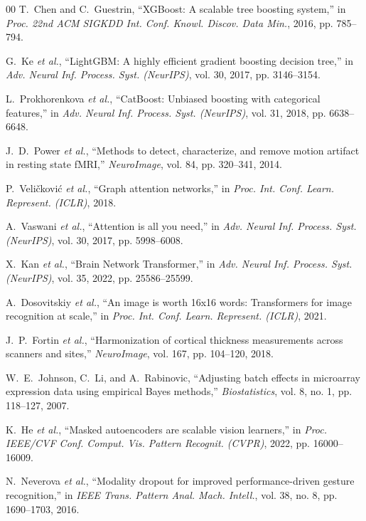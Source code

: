 \documentclass[journal]{IEEEtran}
\begin{document}
\begin{thebibliography}{00}
T.~Chen and C.~Guestrin, ``XGBoost: A scalable tree boosting system,'' in \textit{Proc. 22nd ACM SIGKDD Int. Conf. Knowl. Discov. Data Min.}, 2016, pp. 785--794.

G.~Ke \textit{et al.}, ``LightGBM: A highly efficient gradient boosting decision tree,'' in \textit{Adv. Neural Inf. Process. Syst. (NeurIPS)}, vol. 30, 2017, pp. 3146--3154.

L.~Prokhorenkova \textit{et al.}, ``CatBoost: Unbiased boosting with categorical features,'' in \textit{Adv. Neural Inf. Process. Syst. (NeurIPS)}, vol. 31, 2018, pp. 6638--6648.

J.~D.~Power \textit{et al.}, ``Methods to detect, characterize, and remove motion artifact in resting state fMRI,'' \textit{NeuroImage}, vol. 84, pp. 320--341, 2014.

P.~Veli{\v{c}}kovi{\'c} \textit{et al.}, ``Graph attention networks,'' in \textit{Proc. Int. Conf. Learn. Represent. (ICLR)}, 2018.

A.~Vaswani \textit{et al.}, ``Attention is all you need,'' in \textit{Adv. Neural Inf. Process. Syst. (NeurIPS)}, vol. 30, 2017, pp. 5998--6008.

X.~Kan \textit{et al.}, ``Brain Network Transformer,'' in \textit{Adv. Neural Inf. Process. Syst. (NeurIPS)}, vol. 35, 2022, pp. 25586--25599.

A.~Dosovitskiy \textit{et al.}, ``An image is worth 16x16 words: Transformers for image recognition at scale,'' in \textit{Proc. Int. Conf. Learn. Represent. (ICLR)}, 2021.

J.~P.~Fortin \textit{et al.}, ``Harmonization of cortical thickness measurements across scanners and sites,'' \textit{NeuroImage}, vol. 167, pp. 104--120, 2018.

W.~E.~Johnson, C.~Li, and A.~Rabinovic, ``Adjusting batch effects in microarray expression data using empirical Bayes methods,'' \textit{Biostatistics}, vol. 8, no. 1, pp. 118--127, 2007.

K.~He \textit{et al.}, ``Masked autoencoders are scalable vision learners,'' in \textit{Proc. IEEE/CVF Conf. Comput. Vis. Pattern Recognit. (CVPR)}, 2022, pp. 16000--16009.

N.~Neverova \textit{et al.}, ``Modality dropout for improved performance-driven gesture recognition,'' in \textit{IEEE Trans. Pattern Anal. Mach. Intell.}, vol. 38, no. 8, pp. 1690--1703, 2016.


\end{thebibliography}
\end{document}
